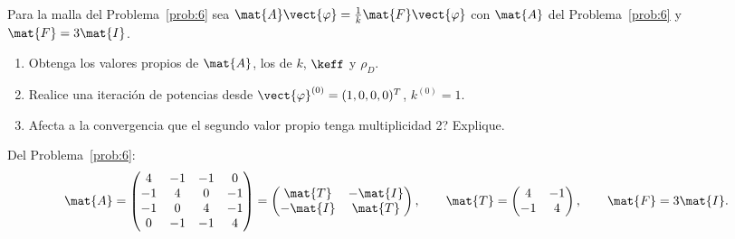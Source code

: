 
\begin{enunciado}
	Para la malla del Problema~\ref{prob:6} sea $\mat{A}\vect{\varphi} = \frac1k\mat{F}\vect{\varphi}$ con $\mat{A}$
	del Problema~\ref{prob:6} y $\mat{F} = 3\mat{I}$.
	\begin{enumerate}[label=(\alph*)]
		\item Obtenga los valores propios de $\mat{A}$, los de $k$, $\keff$ y $\rho_D$.
		\item Realice una iteración de potencias desde $\vect{\varphi}^{(0)} = (1, 0, 0, 0)^T$, $k^{(0)} = 1$.
		\item Afecta a la convergencia que el segundo valor propio tenga multiplicidad 2? Explique.
	\end{enumerate}
\end{enunciado}

Del Problema~\ref{prob:6}:
\[
\mat{A} =
\begin{pmatrix}
	4 & -1 & -1 &  0\\
	-1 &  4 &  0 & -1\\
	-1 &  0 &  4 & -1\\
	0 & -1 & -1 &  4
\end{pmatrix}
= \begin{pmatrix} \mat{T} & -\mat{I}\\ -\mat{I} & \mat{T} \end{pmatrix},
\qquad \mat{T} = \begin{pmatrix} 4 & -1\\ -1 & 4 \end{pmatrix},
\qquad \mat{F} = 3\mat{I} .
\]



